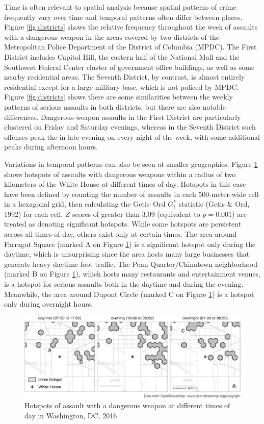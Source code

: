 \documentclass[
  english,
  man,a4paper,mask,floatsintext]{apa6}
\begin{document}
Time is often relevant to spatial analysis because spatial patterns of crime frequently vary over time and temporal patterns often differ between places. Figure \ref{fig:districts} shows the relative frequency throughout the week of assaults with a dangerous weapon in the areas covered by two districts of the Metropolitan Police Department of the District of Columbia (MPDC). The First District includes Capitol Hill, the eastern half of the National Mall and the Southwest Federal Center cluster of government office buildings, as well as some nearby residential areas. The Seventh District, by contrast, is almost entirely residential except for a large military base, which is not policed by MPDC. Figure \ref{fig:districts} shows there are some similarities between the weekly patterns of serious assaults in both districts, but there are also notable differences. Dangerous-weapon assaults in the First District are particularly clustered on Friday and Saturday evenings, whereas in the Seventh District such offenses peak the in late evening on every night of the week, with some additional peaks during afternoon hours.

Variations in temporal patterns can also be seen at smaller geographies. Figure \ref{fig:hotspots} shows hotspots of assaults with dangerous weapons within a radius of two kilometers of the White House at different times of day. Hotspots in this case have been defined by counting the number of assaults in each 500-meter-wide cell in a hexagonal grid, then calculating the Getis--Ord \(G_i^*\) statistic (Getis \& Ord, 1992) for each cell. \(Z\) scores of greater than \(3.09\) (equivalent to \(p = 0.001\)) are treated as denoting significant hotspots. While some hotspots are persistent across all times of day, others exist only at certain times. The area around Farragut Square (marked A on Figure \ref{fig:hotspots}) is a significant hotspot only during the daytime, which is unsurprising since the area hosts many large businesses that generate heavy daytime foot traffic. The Penn Quarter/Chinatown neighborhood (marked B on Figure \ref{fig:hotspots}), which hosts many restaurants and entertainment venues, is a hotspot for serious assaults both in the daytime and during the evening. Meanwhile, the area around Dupont Circle (marked C on Figure \ref{fig:hotspots}) is a hotspot only during overnight hours.

\begin{figure}
\centering
\includegraphics{figure_14-6.eps}
\caption{\label{fig:hotspots}Hotspots of assault with a dangerous weapon at different times of day in Washington, DC, 2016}
\end{figure}
\end{document}

